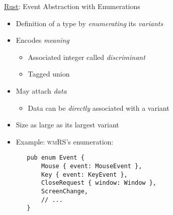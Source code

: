 \begin{frame}[fragile]{\underline{Rust}: Event Abstraction with Enumerations \hfill {\footnotesize \currentname}}


    \begin{itemize}

        \item Definition of a type by \textit{enumerating} its \textit{variants}

        \item Encodes \textit{meaning}
            \begin{itemize}
                \item Associated integer called \textit{discriminant}
                \item Tagged union
            \end{itemize}

        \item May attach \textit{data}
            \begin{itemize}
                \item Data can be \textit{directly} associated with a variant
            \end{itemize}

        \item Size as large as its largest variant

        \item Example: \textsc{wmRS}'s  enumeration:\\
\begin{verbatim}
   pub enum Event {
       Mouse { event: MouseEvent },
       Key { event: KeyEvent },
       CloseRequest { window: Window },
       ScreenChange,
       // ...
   }
\end{verbatim}

    \end{itemize}

    \vfill

\end{frame}

